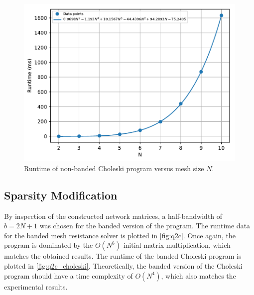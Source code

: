 \documentclass[a4paper,titlepage]{article}
\begin{document}
	\begin{figure}[!htb]
		\centering
		\includegraphics[width=\columnwidth]{plots/q2b_choleski.pdf}
		\caption
		{Runtime of non-banded Choleski program versus mesh size $N$.}
		\label{fig:q2b_choleski}
	\end{figure}
	
	\subsection{Sparsity Modification}
	
	 By inspection of the constructed network matrices, a half-bandwidth of $b = 2N + 1$ was chosen for the banded version of the program. The runtime data for the banded mesh resistance solver is plotted in \autoref{fig:q2c}. Once again, the program is dominated by the $O(N^6)$ initial matrix multiplication, which matches the obtained results. The runtime of the banded Choleski program is plotted in \autoref{fig:q2c_choleski}. Theoretically, the banded version of the Choleski program should have a time complexity of $O(N^4)$, which also matches the experimental results.
	
\end{document}
